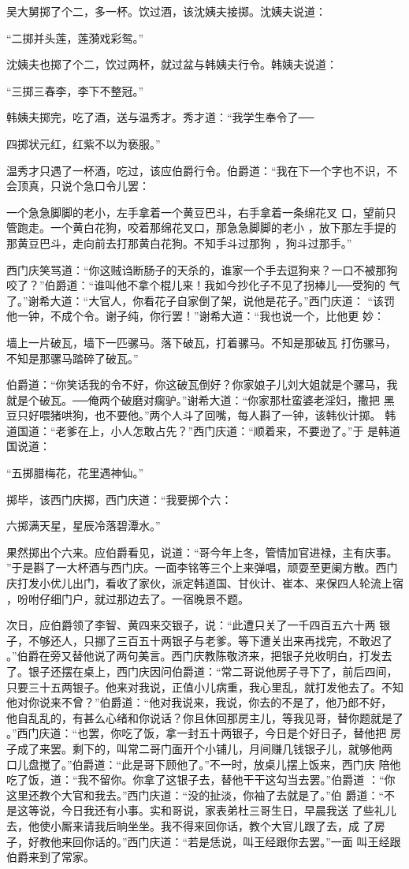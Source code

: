 吴大舅掷了个二，多一杯。饮过酒，该沈姨夫接掷。沈姨夫说道：

“二掷并头莲，莲漪戏彩鸳。”

沈姨夫也掷了个二，饮过两杯，就过盆与韩姨夫行令。韩姨夫说道：

“三掷三春李，李下不整冠。”

韩姨夫掷完，吃了酒，送与温秀才。秀才道：“我学生奉令了──

四掷状元红，红紫不以为亵服。”

温秀才只遇了一杯酒，吃过，该应伯爵行令。伯爵道：“我在下一个字也不识，不
会顶真，只说个急口令儿罢：

一个急急脚脚的老小，左手拿着一个黄豆巴斗，右手拿着一条绵花叉
口，望前只管跑走。一个黄白花狗，咬着那绵花叉口，那急急脚脚的老小
，放下那左手提的那黄豆巴斗，走向前去打那黄白花狗。不知手斗过那狗
，狗斗过那手。”

西门庆笑骂道：“你这贼诌断肠子的天杀的，谁家一个手去逗狗来？一口不被那狗
咬了？”伯爵道：“谁叫他不拿个棍儿来！我如今抄化子不见了拐棒儿──受狗的
气了。”谢希大道：“大官人，你看花子自家倒了架，说他是花子。”西门庆道：
“该罚他一钟，不成个令。谢子纯，你行罢！”谢希大道：“我也说一个，比他更
妙：

墙上一片破瓦，墙下一匹骡马。落下破瓦，打着骡马。不知是那破瓦
打伤骡马，不知是那骡马踏碎了破瓦。”

伯爵道：“你笑话我的令不好，你这破瓦倒好？你家娘子儿刘大姐就是个骡马，我
就是个破瓦。──俺两个破磨对瘸驴。”谢希大道：“你家那杜蛮婆老淫妇，撒把
黑豆只好喂猪哄狗，也不要他。”两个人斗了回嘴，每人斟了一钟，该韩伙计掷。
韩道国道：“老爹在上，小人怎敢占先？”西门庆道：“顺着来，不要逊了。”于
是韩道国说道：

“五掷腊梅花，花里遇神仙。”

掷毕，该西门庆掷，西门庆道：“我要掷个六：

六掷满天星，星辰冷落碧潭水。”

果然掷出个六来。应伯爵看见，说道：“哥今年上冬，管情加官进禄，主有庆事。
”于是斟了一大杯酒与西门庆。一面李铭等三个上来弹唱，顽耍至更阑方散。西门
庆打发小优儿出门，看收了家伙，派定韩道国、甘伙计、崔本、来保四人轮流上宿
，吩咐仔细门户，就过那边去了。一宿晚景不题。

次日，应伯爵领了李智、黄四来交银子，说：“此遭只关了一千四百五六十两
银子，不够还人，只挪了三百五十两银子与老爹。等下遭关出来再找完，不敢迟了
。”伯爵在旁又替他说了两句美言。西门庆教陈敬济来，把银子兑收明白，打发去
了。银子还摆在桌上，西门庆因问伯爵道：“常二哥说他房子寻下了，前后四间，
只要三十五两银子。他来对我说，正值小儿病重，我心里乱，就打发他去了。不知
他对你说来不曾？”伯爵道：“他对我说来，我说，你去的不是了，他乃郎不好，
他自乱乱的，有甚么心绪和你说话？你且休回那房主儿，等我见哥，替你题就是了
。”西门庆道：“也罢，你吃了饭，拿一封五十两银子，今日是个好日子，替他把
房子成了来罢。剩下的，叫常二哥门面开个小铺儿，月间赚几钱银子儿，就够他两
口儿盘搅了。”伯爵道：“此是哥下顾他了。”不一时，放桌儿摆上饭来，西门庆
陪他吃了饭，道：“我不留你。你拿了这银子去，替他干干这勾当去罢。”伯爵道
：“你这里还教个大官和我去。”西门庆道：“没的扯淡，你袖了去就是了。”伯
爵道：“不是这等说，今日我还有小事。实和哥说，家表弟杜三哥生日，早晨我送
了些礼儿去，他使小厮来请我后晌坐坐。我不得来回你话，教个大官儿跟了去，成
了房子，好教他来回你话的。”西门庆道：“若是恁说，叫王经跟你去罢。”一面
叫王经跟伯爵来到了常家。

